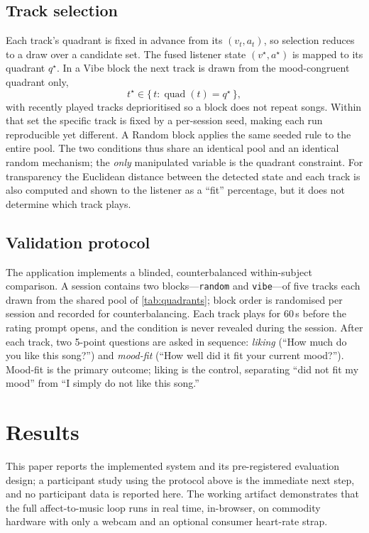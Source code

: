 \subsection{Track selection}
Each track's quadrant is fixed in advance from its $(v_t, a_t)$, so selection
reduces to a draw over a candidate set. The fused listener state
$(v^\star, a^\star)$ is mapped to its quadrant $q^\star$. In a Vibe block the next
track is drawn from the mood-congruent quadrant only,
\begin{equation}
t^\star \in \{\, t : \operatorname{quad}(t) = q^\star \,\},
\end{equation}
with recently played tracks deprioritised so a block does not repeat songs. Within
that set the specific track is fixed by a per-session seed, making each run
reproducible yet different. A Random block applies the same seeded rule to the
entire pool. The two conditions thus share an identical pool and an identical
random mechanism; the \emph{only} manipulated variable is the quadrant constraint.
For transparency the Euclidean distance between the detected state and each track
is also computed and shown to the listener as a ``fit'' percentage, but it does
not determine which track plays.

\subsection{Validation protocol}
The application implements a blinded, counterbalanced within-subject comparison.
A session contains two blocks---\texttt{random} and \texttt{vibe}---of five tracks
each drawn from the shared pool of \autoref{tab:quadrants}; block order is
randomised per session and recorded for counterbalancing. Each track plays for 60\,s before the rating prompt opens, and
the condition is never revealed during the session. After each track, two 5-point
questions are asked in sequence: \emph{liking} (``How much do you like this
song?'') and \emph{mood-fit} (``How well did it fit your current mood?''). Mood-fit
is the primary outcome; liking is the control, separating ``did not fit my mood''
from ``I simply do not like this song.''

\section{Results}

This paper reports the implemented system and its pre-registered evaluation
design; a participant study using the protocol above is the immediate next step,
and no participant data is reported here. The working artifact demonstrates that
the full affect-to-music loop runs in real time, in-browser, on commodity
hardware with only a webcam and an optional consumer heart-rate strap.

